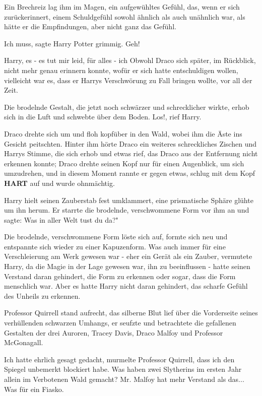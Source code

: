 Ein Brechreiz lag ihm im Magen, ein aufgewühltes Gefühl, das, wenn er sich
zurückerinnert, einem Schuldgefühl sowohl ähnlich als auch unähnlich war,
als hätte er die Empfindungen, aber nicht ganz das Gefühl.

\glqq Ich muss\grqq{}, sagte Harry Potter grimmig. \glqq Geh!\grqq{}

\glqq Harry, es - es tut mir leid, für alles - ich\grqq{} Obwohl Draco sich
später, im Rückblick, nicht mehr genau erinnern konnte, wofür er sich
hatte entschuldigen wollen, vielleicht war es, dass er Harrys
Verschwörung zu Fall bringen wollte, vor all der Zeit.

Die brodelnde Gestalt, die jetzt noch schwärzer und schrecklicher wirkte, erhob
sich in die Luft und schwebte über dem Boden. \glqq Los!\grqq{}, rief
Harry.

Draco drehte sich um und floh kopfüber in den Wald, wobei ihm die Äste ins
Gesicht peitschten. Hinter ihm hörte Draco ein weiteres schreckliches
Zischen und Harrys Stimme, die sich erhob und etwas rief, das Draco aus
der Entfernung nicht erkennen konnte; Draco drehte seinen Kopf nur für
einen Augenblick, um sich umzudrehen, und in diesem Moment rannte er
gegen etwas, schlug mit dem Kopf \textbf{HART} auf und wurde ohnmächtig.

Harry hielt seinen Zauberstab fest umklammert, eine prismatische Sphäre glühte
um ihn herum. Er starrte die brodelnde, verschwommene Form vor ihm an und
sagte: \glqq Was in aller Welt tust du da?"

Die brodelnde, verschwommene Form löste sich auf, formte sich neu und entspannte
sich wieder zu einer Kapuzenform. Was auch immer für eine Verschleierung
am Werk gewesen war - eher ein Gerät als ein Zauber, vermutete Harry, da
die Magie in der Lage gewesen war, ihn zu beeinflussen - hatte seinen
Verstand daran gehindert, die Form zu erkennen oder sogar, dass die Form
menschlich war. Aber es hatte Harry nicht daran gehindert, das scharfe
Gefühl des Unheils zu erkennen.

Professor Quirrell stand aufrecht, das silberne Blut lief über die Vorderseite
seines verhüllenden schwarzen Umhangs, er seufzte und betrachtete die
gefallenen Gestalten der drei Auroren, Tracey Davis, Draco Malfoy und
Professor McGonagall.

\glqq Ich hatte ehrlich gesagt gedacht\grqq{}, murmelte Professor Quirrell,
\glqq dass ich den Spiegel unbemerkt blockiert habe. Was haben zwei
Slytherins im ersten Jahr allein im Verbotenen Wald gemacht? Mr. Malfoy
hat mehr Verstand als das... Was für ein Fiasko.\grqq{}

